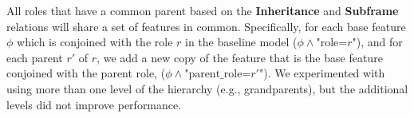 \documentclass[11pt,a4paper]{article}
\makeatletter
\renewcommand{\paragraph}{%
  \@startsection{paragraph}{4}%
  {\z@}{.2ex \@plus 1ex \@minus .2ex}{-1em}%
  {\normalfont\normalsize\bfseries}%
}
\makeatother
\begin{document}
All roles that have a common parent based on the
\textbf{Inheritance} and \textbf{Subframe} relations will share a set of
features in common.
Specifically, for each base feature $\phi$ which is conjoined with the role $r$
in the baseline model ($\phi \wedge \text{"role=}r\text{"}$), and for each parent $r'$ of
$r$, we add a new copy of the feature that is the base feature conjoined with
the parent role, ($\phi \wedge \text{"parent\_role=}r'\text{"}$).
We experimented with using more than one level of the hierarchy (e.g.,
grandparents),
but the additional levels did not improve performance.


\end{document}
